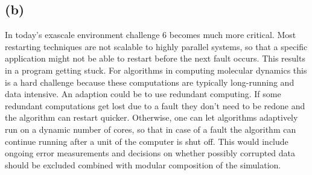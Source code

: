 \subsection*{(b)}
In today's exascale environment challenge 6 becomes much more critical. Most restarting techniques are not scalable to highly parallel systems, so that a specific application might not be able to restart before the next fault occurs. This results in a program getting stuck. For algorithms in computing molecular dynamics this is a hard challenge because these computations are typically long-running and data intensive. An adaption could be to use redundant computing. If some redundant computations get lost due to a fault they don't need to be redone and the algorithm can restart quicker. Otherwise, one can let algorithms adaptively run on a dynamic number of cores, so that in case of a fault the algorithm can continue running after a unit of the computer is shut off. This would include ongoing error measurements and decisions on whether possibly corrupted data should be excluded combined with modular composition of the simulation.